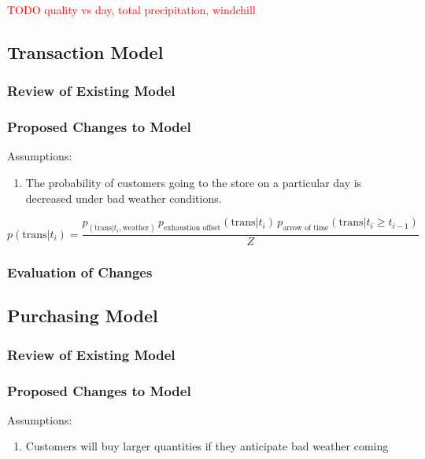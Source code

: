 \documentclass[11pt, letterpaper]{article}
\begin{document}
\textcolor{red}{TODO quality vs day, total precipitation, windchill}

\subsection{Transaction Model}

\subsubsection{Review of Existing Model}

\subsubsection{Proposed Changes to Model}

Assumptions:
\begin{enumerate}
\item The probability of customers going to the store on a particular day is decreased under bad weather conditions.
\end{enumerate}

\begin{equation}
p(\text{trans} | t_i) = \frac{p_(\text{trans} | t_i, \text{weather}) \, p_{\text{exhaustion offset}}(\text{trans} | t_i) \, p_{\text{arrow of time}}(\text{trans} | t_i \geq t_{i-1})}{Z}
\end{equation}

\subsubsection{Evaluation of Changes}

\subsection{Purchasing Model}

\subsubsection{Review of Existing Model}

\subsubsection{Proposed Changes to Model}

Assumptions:
\begin{enumerate}
\item Customers will buy larger quantities if they anticipate bad weather coming
\end{enumerate}
\end{document}
